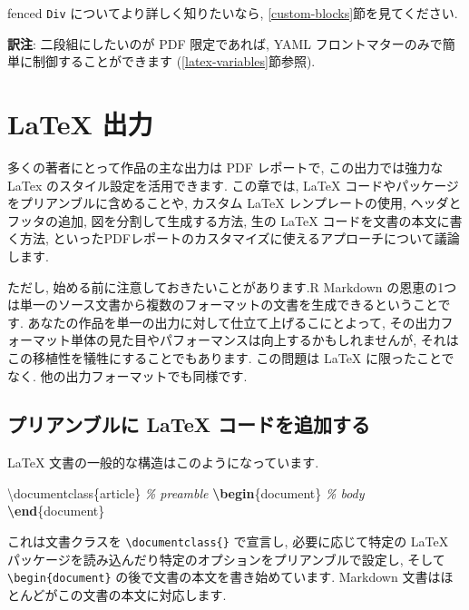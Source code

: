 \documentclass[
  11pt,
]{bxjsreport}
\newenvironment{Shaded}{\begin{snugshade}}{\end{snugshade}}
\newcommand{\BuiltInTok}[1]{#1}
\newcommand{\CommentTok}[1]{\textcolor[rgb]{0.56,0.35,0.01}{\textit{#1}}}
\newcommand{\ExtensionTok}[1]{#1}
\newcommand{\KeywordTok}[1]{\textcolor[rgb]{0.13,0.29,0.53}{\textbf{#1}}}
\newcommand{\NormalTok}[1]{#1}
\begin{document}
fenced \texttt{Div} についてより詳しく知りたいなら, \ref{custom-blocks}節を見てください.

\textbf{訳注}: 二段組にしたいのが PDF 限定であれば, YAML フロントマターのみで簡単に制御することができます (\ref{latex-variables}節参照).

\hypertarget{latex-output}{%
\chapter{LaTeX 出力}\label{latex-output}}

多くの著者にとって作品の主な出力は PDF レポートで, この出力では強力な LaTex のスタイル設定を活用できます. この章では, LaTeX コードやパッケージをプリアンブルに含めることや, カスタム LaTeX レンプレートの使用, ヘッダとフッタの追加, 図を分割して生成する方法, 生の LaTeX コードを文書の本文に書く方法, といったPDFレポートのカスタマイズに使えるアプローチについて議論します.

ただし, 始める前に注意しておきたいことがあります.R Markdown の恩恵の1つは単一のソース文書から複数のフォーマットの文書を生成できるということです. あなたの作品を単一の出力に対して仕立て上げるこにとよって, その出力フォーマット単体の見た目やパフォーマンスは向上するかもしれませんが, それはこの移植性を犠牲にすることでもあります. この問題は LaTeX に限ったことでなく. 他の出力フォーマットでも同様です.

\hypertarget{latex-preamble}{%
\section{プリアンブルに LaTeX コードを追加する}\label{latex-preamble}}

LaTeX 文書の一般的な構造はこのようになっています.

\begin{Shaded}
\begin{Highlighting}[]
\BuiltInTok{\textbackslash{}documentclass}\NormalTok{\{}\ExtensionTok{article}\NormalTok{\}}
\CommentTok{\% preamble}
\KeywordTok{\textbackslash{}begin}\NormalTok{\{}\ExtensionTok{document}\NormalTok{\}}
\CommentTok{\% body}
\KeywordTok{\textbackslash{}end}\NormalTok{\{}\ExtensionTok{document}\NormalTok{\}}
\end{Highlighting}
\end{Shaded}

これは文書クラスを \texttt{\textbackslash{}documentclass\{\}} で宣言し, 必要に応じて特定の LaTeX パッケージを読み込んだり特定のオプションをプリアンブルで設定し, そして \texttt{\textbackslash{}begin\{document\}} の後で文書の本文を書き始めています. Markdown 文書はほとんどがこの文書の本文に対応します.
\end{document}

